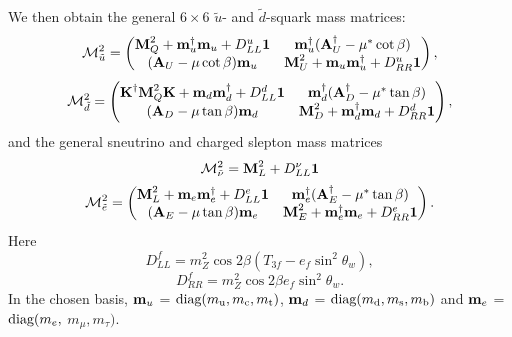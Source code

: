 We then obtain the general $6\times6$ $\tilde{u}$- and
$\tilde{d}$-squark mass matrices:
\begin{equation}
  {\cal M}_{\tilde u}^2 = \left( 
     \begin{matrix} %
      \mbox{\bf M}_Q^2 + \mbox{\bf m}_u^\dagger \mbox{\bf m}_u +
      D_{LL}^{u} \mbox{\bf 1} &
      \mbox{\bf m}_u^\dagger 
      ( {\bf A}_U^\dagger - \mu^* \cot\beta ) \cr
      ( {\bf A}_U - \mu \cot\beta ) \mbox{\bf m}_u &
      \mbox{\bf M}_U^2 + \mbox{\bf m}_u \mbox{\bf m}_u^\dagger +
      D_{RR}^{u} \mbox{\bf 1} \cr
      \end{matrix} %
      \right),
  \label{mutilde}
\end{equation}
\begin{equation}
  {\cal M}_{\tilde d}^2=\left( {
        \begin{matrix} %
        {\mbox{\bf K}^\dagger \mbox{\bf M}_Q^2 \mbox{\bf K}+
          \mbox{\bf m}_d\mbox{\bf m}_d^\dagger+D_{LL}^{d}\mbox{\bf 1}}&
        {\mbox{\bf m}_d^\dagger ( {\bf A}_D^\dagger-\mu^*\tan\beta )}\cr
        {( {\bf A}_D-\mu\tan\beta ) \mbox{\bf m}_d}&
        {\mbox{\bf M}_D^2+\mbox{\bf m}_d^\dagger\mbox{\bf m}_d+
          D_{RR}^{d}\mbox{\bf 1}}\cr
        \end{matrix} %
        } \right),
  \label{mdtilde}
\end{equation}
and the general sneutrino and charged slepton mass matrices
\begin{equation}
  {\cal M}^2_{\tilde\nu} = \mbox{\bf M}_L^2 + D^\nu_{LL} \mbox{\bf 1}
\end{equation}
\begin{equation}
  {\cal M}^2_{\tilde e} =\left( {
       \begin{matrix} %
        {\mbox{\bf M}_L^2+\mbox{\bf m}_e\mbox{\bf m}_e^\dagger+
          D_{LL}^{e}\mbox{\bf 1}}&
        {\mbox{\bf m}_e^\dagger ( {\bf A}_E^\dagger-\mu^*\tan\beta )}\cr
        {( {\bf A}_E-\mu\tan\beta ) \mbox{\bf m}_e}&
        {\mbox{\bf M}_E^2+\mbox{\bf m}_e^\dagger\mbox{\bf m}_e+
          D_{RR}^{e}\mbox{\bf 1}}\cr
        \end{matrix} %
        } \right).
  \label{metilde}
\end{equation}
Here
\begin{equation}
  D^f_{LL}=m_Z^2\cos 2\beta(T_{3f}-e_f\sin^2\theta_w),
\end{equation}
\begin{equation}
  D^f_{RR}=m_Z^2\cos 2\beta e_f\sin^2\theta_w.
\end{equation}
In the chosen basis, $\mbox{\bf m}_u$ = $\mbox{\rm diag} ( m_{\rm
u}, m_{\rm c}, m_{\rm t} )$, $\mbox{\bf m}_d $ = $\mbox{\rm diag}
(m_{\rm d}, m_{\rm s}, m_{\rm b} )$ and $\mbox{\bf m}_e $ = $
\mbox{\rm diag} (m_e,$ $ m_\mu, m_\tau )$.

